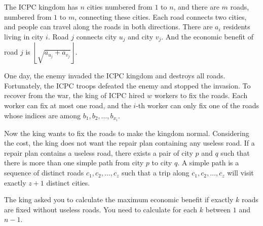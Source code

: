 The ICPC kingdom has $n$ cities numbered from $1$ to $n$, 
and there are $m$ roads, numbered from $1$ to $m$,  connecting these cities. 
Each road connects two cities, and people can travel along the roads in both directions.
There are $a_i$ residents living in city $i$.
Road $j$ connects city $u_j$ and city $v_j$. 
And the economic benefit of road $j$ is $\left\lfloor\sqrt{a_{u_j}+a_{v_j}}\right\rfloor$.

One day, the enemy invaded the ICPC kingdom and destroys all roads.
Fortunately, the ICPC troops defeated the enemy and stopped the invasion.
To recover from the war, the king of ICPC hired $w$ workers to fix the roads.
Each worker can fix at most one road, and
the $i$-th worker can only fix one of the roads whose indices are among $b_1,b_2,\dots,b_{x_i}$.

Now the king wants to fix the roads to make the kingdom normal.
Considering the cost, the king does not want the repair plan containing any useless road.
If a repair plan contains a useless road, there exists a pair of city $p$ and $q$
such that there is more than one simple path from city $p$ to city $q$.
A simple path is a sequence of distinct roads $c_1,c_2,\dots,c_z$ such that 
a trip along $c_1,c_2,\dots,c_z$ will visit exactly $z+1$ distinct cities. 

The king asked you to calculate the maximum economic benefit if exactly $k$ roads are fixed without useless roads.
You need to calculate for each $k$ between $1$ and $n-1$.
